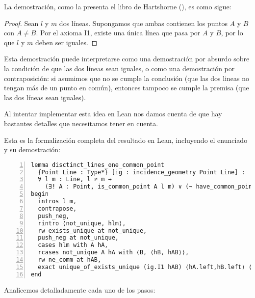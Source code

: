 
La demostración, como la presenta el libro de Hartshorne (), es como
sigue:
\begin{proof}
	Sean $l$ y $m$ dos líneas. Supongamos que ambas contienen los puntos $A$ y
	$B$ con $A\ne B$. Por el axioma I1, existe una única línea que pasa por $A$
	y $B$, por lo que $l$ y $m$ deben ser iguales.
\end{proof}

Esta demostración puede interpretarse como una demostración por absurdo sobre la
condición de que las dos líneas sean iguales, o como una demostración por
contraposición: si asumimos que no se cumple la conclusión (que las dos lineas
no tengan más de un punto en común), entonces tampoco se cumple la premisa (que las
dos líneas sean iguales).

Al intentar implementar esta idea en Lean nos damos cuenta de que hay bastantes
detalles que necesitamos tener en cuenta.

Esta es la formalización completa del resultado en Lean, incluyendo el enunciado
y su demostración:

\begin{lstlisting}[numbers=left, caption={\lstinline{disctinct_lines_one_common_point}}]
lemma disctinct_lines_one_common_point
  {Point Line : Type*} [ig : incidence_geometry Point Line] :
  ∀ l m : Line, l ≠ m →
    (∃! A : Point, is_common_point A l m) ∨ (¬ have_common_point Point l m) :=
begin
  intros l m,
  contrapose,
  push_neg,
  rintro ⟨not_unique, hlm⟩,
  rw exists_unique at not_unique,
  push_neg at not_unique,
  cases hlm with A hA,
  rcases not_unique A hA with ⟨B, ⟨hB, hAB⟩⟩,
  rw ne_comm at hAB,
  exact unique_of_exists_unique (ig.I1 hAB) ⟨hA.left,hB.left⟩ ⟨hA.right,hB.right⟩,
end
\end{lstlisting}


Analicemos detalladamente cada uno de los pasos:

